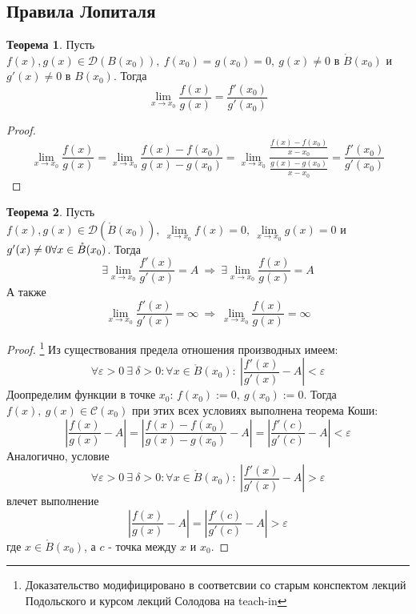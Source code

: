 \documentclass[a4paper, 12pt]{article}
\renewcommand{\epsilon}{\varepsilon}
\theoremstyle{definition}
\newtheorem*{theorem}{Теорема}
\begin{document}
        \subsection{Правила Лопиталя}
        \begin{theorem}
            Пусть $f(x),g(x)\in \mathcal{D}(B(x_0)),\ f(x_0)=g(x_0)=0,\ g(x)\ne 0$ в $\mathring{B}(x_0)$ и\\
            $g'(x)\ne 0$ в $B(x_0)$. Тогда 
            \[\lim\limits_{x\to x_0}\frac{f(x)}{g(x)}=\frac{f'(x_0)}{g'(x_0)}\]
        \end{theorem} 
        \begin{proof}
            \[\lim\limits_{x\to x_0}\frac{f(x)}{g(x)}=\lim\limits_{x\to x_0}\frac{f(x)-f(x_0)}{g(x)-g(x_0)}=\lim\limits_{x\to x_0}\frac{\frac{f(x)-f(x_0)}{x-x_0}}{\frac{g(x)-g(x_0)}{x-x_0}}=\frac{f'(x_0)}{g'(x_0)}\]
        \end{proof} 
        \begin{theorem}
            Пусть $f(x),g(x)\in \mathcal{D}(\mathring{B}(x_0)),\ \lim\limits_{x\to x_0}f(x)=0,\ \lim\limits_{x\to x_0}g(x)=0$ и $g'(x)\ne 0\\
            \forall x\in \mathring{B}(x_0)$. Тогда 
            \[\exists \lim\limits_{x\to x_0}\frac{f'(x)}{g'(x)}=A\ \Rightarrow\ \exists \lim\limits_{x\to x_0}\frac{f(x)}{g(x)}=A\]
            А также
            \[\lim\limits_{x\to x_0}\frac{f'(x)}{g'(x)}=\infty\ \Rightarrow\ \lim\limits_{x\to x_0}\frac{f(x)}{g(x)}=\infty\]
        \end{theorem} 
        \begin{proof}\footnote{Доказательство модифицировано в соответсвии со старым конспектом лекций Подольского и курсом лекций Солодова на teach-in} Из существования предела отношения производных имеем:
            \[\forall \epsilon>0\ \exists\ \delta>0: \forall x\in \mathring{B}(x_0):\ |\frac{f'(x)}{g'(x)}-A|<\epsilon\]
            Доопределим функции в точке $x_0$: $f(x_0):=0,\ g(x_0):=0$.
            Тогда\\
            $f(x),\ g(x)\in \mathcal{C}(x_0)$  при этих всех условиях выполнена теорема Коши:
            \[|\frac{f(x)}{g(x)}-A|=|\frac{f(x)-f(x_0)}{g(x)-g(x_0)}-A|=|\frac{f'(c)}{g'(c)}-A|<\epsilon\]
            Аналогично,  условие
            \[\forall \epsilon>0\ \exists\ \delta>0: \forall x\in \mathring{B}(x_0):\ |\frac{f'(x)}{g'(x)}-A|>\epsilon\]
            влечет выполнение
            \[|\frac{f(x)}{g(x)}-A|=|\frac{f'(c)}{g'(c)}-A|>\epsilon\]
            где $x\in \mathring{B}(x_0)$, а $c$ - точка между $x$ и $x_0$.
        \end{proof} 
\end{document}
